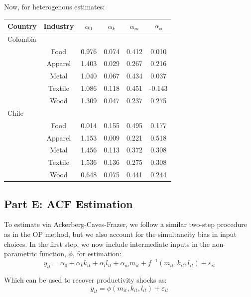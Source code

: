 \documentclass{article}
\begin{document}
\vspace{1cm}
Now, for heterogenous estimates:
\begin{center}
\begin{tabular}[h]{|lccccc|}
  \hline
  \textbf{Country} & \textbf{Industry} & \textbf{$\alpha_0$} & \textbf{$\alpha_k$} & \textbf{$\alpha_m$} & \textbf{$\alpha_{\phi}$} \\
  \hline
  \hline
  Colombia & & & & & \\
  \hline
   & Food & 0.976 & 0.074 & 0.412 & 0.010 \\
   & Apparel & 1.403 & 0.029 & 0.267 & 0.216 \\
   & Metal & 1.040 & 0.067 & 0.434 & 0.037 \\
   & Textile & 1.086 & 0.118 & 0.451 & -0.143 \\
   & Wood & 1.309 & 0.047 & 0.237 & 0.275 \\
   \hline
  Chile & & & & & \\
  \hline
   & Food & 0.014 & 0.155 & 0.495 & 0.177 \\
   & Apparel & 1.153 & 0.009 & 0.221 & 0.518 \\
   & Metal & 1.456 & 0.113 & 0.372 & 0.308 \\
   & Textile & 1.536 & 0.136 & 0.275 & 0.308 \\
   & Wood & 0.648 & 0.075 & 0.441 & 0.244 \\
   \hline
\end{tabular}
\end{center}

\subsection*{Part E: ACF Estimation}

To estimate via Ackerberg-Caves-Frazer, we follow a similar two-step procedure as in the OP method, but we also account for the simultaneity bias in input choices.
In the first step, we now include intermediate inputs in the non-parametric function, $\phi$, for estimation:
\begin{equation}
  y_{it} = \alpha_0 + \alpha_k k_{it} + \alpha_l l_{it} + \alpha_m m_{it} + f^{-1}(m_{it}, k_{it}, l_{it}) + \varepsilon_{it}
\end{equation}

Which can be used to recover productivity shocks as:
\begin{equation}
  y_{it} = \phi(m_{it}, k_{it}, l_{it}) + \varepsilon_{it}  
\end{equation}
\end{document}
